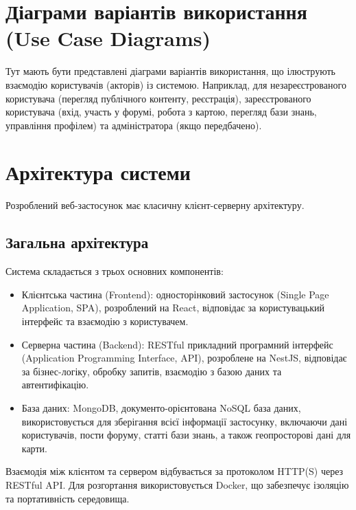 \section{Діаграми варіантів використання (Use Case Diagrams)}
\label{sec:use_cases}
Тут мають бути представлені діаграми варіантів використання, що ілюструють взаємодію користувачів (акторів) із системою. Наприклад, для незареєстрованого користувача (перегляд публічного контенту, реєстрація), зареєстрованого користувача (вхід, участь у форумі, робота з картою, перегляд бази знань, управління профілем) та адміністратора (якщо передбачено).

\section{Архітектура системи}
\label{sec:architecture}
Розроблений веб-застосунок має класичну клієнт-серверну архітектуру. 

\subsection{Загальна архітектура}
Система складається з трьох основних компонентів: 
\begin{itemize}
    \item Клієнтська частина (Frontend): односторінковий застосунок (Single Page Application, SPA), розроблений на React, відповідає за користувацький інтерфейс та взаємодію з користувачем.
    \item Серверна частина (Backend): RESTful прикладний програмний інтерфейс (Application Programming Interface, API), розроблене на NestJS, відповідає за бізнес-логіку, обробку запитів, взаємодію з базою даних та автентифікацію.
    \item База даних: MongoDB, документо-орієнтована NoSQL база даних, використовується для зберігання всієї інформації застосунку, включаючи дані користувачів, пости форуму, статті бази знань, а також геопросторові дані для карти.
\end{itemize}
Взаємодія між клієнтом та сервером відбувається за протоколом HTTP(S) через RESTful API. Для розгортання використовується Docker, що забезпечує ізоляцію та портативність середовища.

